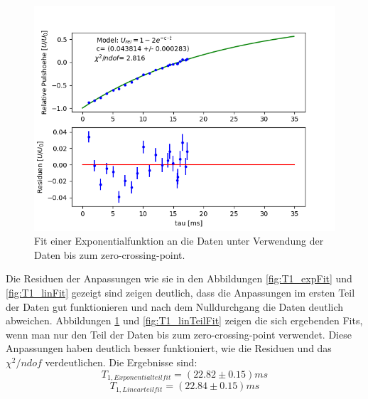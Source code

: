 \documentclass[12pt,a4paper]{article}
\begin{document}
\begin{figure}
\centering
\includegraphics[scale=0.7]{Bilder/T1_expTeilFit.PNG}
\caption{Fit einer Exponentialfunktion an die Daten unter Verwendung der Daten bis zum zero-crossing-point.}
\label{fig:T1_expTeilFit}
\end{figure}

Die Residuen der Anpassungen wie sie in den Abbildungen \ref{fig:T1_expFit} und \ref{fig:T1_linFit} gezeigt sind zeigen deutlich, dass die Anpassungen im ersten Teil der Daten gut funktionieren und nach dem Nulldurchgang die Daten deutlich abweichen. Abbildungen \ref{fig:T1_expTeilFit} und \ref{fig:T1_linTeilFit} zeigen die sich ergebenden Fits, wenn man nur den Teil der Daten bis zum zero-crossing-point verwendet. Diese Anpassungen haben deutlich besser funktioniert, wie die Residuen und das $\chi ^2 /ndof$ verdeutlichen. Die Ergebnisse sind:
\begin{equation*}
T_{1, Exponentialteilfit} = (22.82 \pm 0.15)ms
\end{equation*}
\begin{equation*}
T_{1, Linearteilfit} = (22.84 \pm 0.15)ms
\end{equation*}
\end{document}
